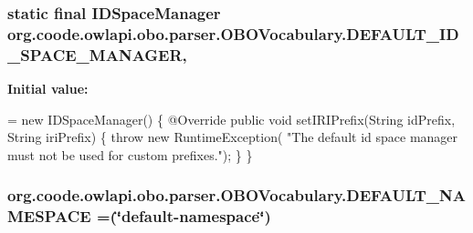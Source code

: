 \hypertarget{enumorg_1_1coode_1_1owlapi_1_1obo_1_1parser_1_1_o_b_o_vocabulary_a37f44bb8708234ef14d0f05960f0dc0f}{
\subsubsection[{D\-E\-F\-A\-U\-L\-T\-\_\-\-I\-D\-\_\-\-S\-P\-A\-C\-E\-\_\-\-M\-A\-N\-A\-G\-E\-R}]{\setlength{\rightskip}{0pt plus 5cm} static  final {\bf I\-D\-Space\-Manager} org.\-coode.\-owlapi.\-obo.\-parser.\-O\-B\-O\-Vocabulary.\-D\-E\-F\-A\-U\-L\-T\-\_\-\-I\-D\-\_\-\-S\-P\-A\-C\-E\-\_\-\-M\-A\-N\-A\-G\-E\-R\hspace{0.3cm}{\ttfamily [static]}, {\ttfamily [private]}}}\label{enumorg_1_1coode_1_1owlapi_1_1obo_1_1parser_1_1_o_b_o_vocabulary_a37f44bb8708234ef14d0f05960f0dc0f}
{\bfseries Initial value\-:}
\begin{DoxyCode}
= \textcolor{keyword}{new} IDSpaceManager() \{
        @Override
        \textcolor{keyword}{public} \textcolor{keywordtype}{void} setIRIPrefix(String idPrefix, String iriPrefix) \{
            \textcolor{keywordflow}{throw} \textcolor{keyword}{new} RuntimeException(
                    \textcolor{stringliteral}{"The default id space manager must not be used for custom prefixes."});
        \}
    \}
\end{DoxyCode}
\hypertarget{enumorg_1_1coode_1_1owlapi_1_1obo_1_1parser_1_1_o_b_o_vocabulary_a0d44f79f05f4f829a44d412851d1d5e8}{
\subsubsection[{D\-E\-F\-A\-U\-L\-T\-\_\-\-N\-A\-M\-E\-S\-P\-A\-C\-E}]{\setlength{\rightskip}{0pt plus 5cm}org.\-coode.\-owlapi.\-obo.\-parser.\-O\-B\-O\-Vocabulary.\-D\-E\-F\-A\-U\-L\-T\-\_\-\-N\-A\-M\-E\-S\-P\-A\-C\-E =(\char`\"{}default-\/namespace\char`\"{})}}\label{enumorg_1_1coode_1_1owlapi_1_1obo_1_1parser_1_1_o_b_o_vocabulary_a0d44f79f05f4f829a44d412851d1d5e8}
